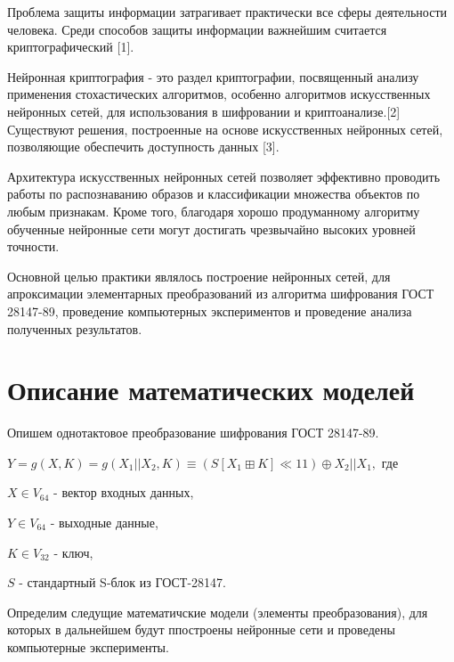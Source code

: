 \documentclass[a4paper,12pt,twoside]{article}
\begin{document}
	Проблема защиты информации затрагивает практически все сферы деятельности человека. Среди способов защиты информации важнейшим считается криптографический [1]. 
	
	Нейронная криптография - это раздел криптографии, посвященный анализу применения стохастических алгоритмов, особенно алгоритмов искусственных нейронных сетей, для использования в шифровании и криптоанализе.[2] Существуют решения, построенные на основе искусственных нейронных сетей, позволяющие обеспечить доступность данных [3].
	
	Архитектура искусственных нейронных сетей позволяет эффективно проводить работы по распознаванию образов и классификации множества объектов по любым признакам. Кроме того, благодаря хорошо продуманному алгоритму обученные нейронные сети могут достигать чрезвычайно высоких уровней точности. 
	
	Основной целью практики являлось построение нейронных сетей, для апроксимации элементарных преобразований из алгоритма шифрования ГОСТ 28147-89, проведение компьютерных экспериментов и проведение анализа полученных результатов. 
	
	\newpage
	
	\section{Описание математических моделей}
	
	\bigskip
	\noindent Опишем однотактовое преобразование шифрования ГОСТ 28147-89.
	\bigskip
	
	$Y = g(X, K) = g(X_1 || X_2, K) \equiv (S[X_1 \boxplus K] \ll 11) \oplus X_2 || X_1,$ где
	
	$X \in V_{64}$ - вектор входных данных,
	
	$Y \in V_{64}$ - выходные данные,
	
	$K \in V_{32}$ - ключ,
	
	$S$ - стандартный S-блок из ГОСТ-28147.
	
	\bigskip
	\noindent 
	Определим следущие математичские модели (элементы преобразования), для которых в дальнейшем будут ппостроены нейронные сети и проведены компьютерные эксперименты.
	
\end{document}
